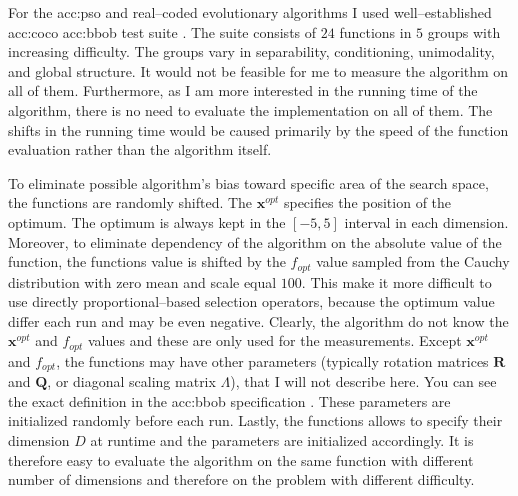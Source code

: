 For the \acrlong{acc:pso} and real--coded evolutionary algorithms I used well--established \acrfull{acc:coco} \acrfull{acc:bbob} test suite \citep{hansen2010comparing}. The suite consists of $24$ functions in $5$ groups with increasing difficulty. The groups vary in separability, conditioning, unimodality, and global structure. It would not be feasible for me to measure the algorithm on all of them. Furthermore, as I am more interested in the running time of the algorithm, there is no need to evaluate the implementation on all of them. The shifts in the running time would be caused primarily by the speed of the function evaluation rather than the algorithm itself.

To eliminate possible algorithm's bias toward specific area of the search space, the functions are randomly shifted. The $\mathbf{x}^{opt}$ specifies the position of the optimum. The optimum is always kept in the $\left[-5,5\right]$ interval in each dimension. Moreover, to eliminate dependency of the algorithm on the absolute value of the function, the functions value is shifted by the $f_{opt}$ value sampled from the Cauchy distribution with zero mean and scale equal $100$. This make it more difficult to use directly proportional--based selection operators, because the optimum value differ each run and may be even negative. Clearly, the algorithm do not know the $\mathbf{x}^{opt}$ and $f_{opt}$ values and these are only used for the measurements. Except $\mathbf{x}^{opt}$ and $f_{opt}$, the functions may have other parameters (typically rotation matrices $\mathbf{R}$ and $\mathbf{Q}$, or diagonal scaling matrix $\Lambda$), that I will not describe here. You can see the exact definition in the \acrshort{acc:bbob} specification \citep{hansen2010comparing}. These parameters are initialized randomly before each run. Lastly, the functions allows to specify their dimension $D$ at runtime and the parameters are initialized accordingly. It is therefore easy to evaluate the algorithm on the same function with different number of dimensions and therefore on the problem with different difficulty.

